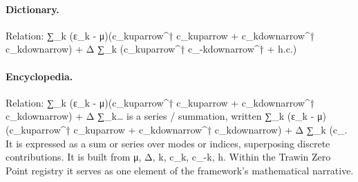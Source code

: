 \paragraph{Dictionary.}
Relation: ∑\_k (ε\_k - μ)(c\_kuparrow\textasciicircum{}† c\_kuparrow + c\_kdownarrow\textasciicircum{}† c\_kdownarrow) + Δ ∑\_k (c\_kuparrow\textasciicircum{}† c\_-kdownarrow\textasciicircum{}† + h.c.)

\paragraph{Encyclopedia.}
Relation: ∑\_k (ε\_k - μ)(c\_kuparrow\textasciicircum{}† c\_kuparrow + c\_kdownarrow\textasciicircum{}† c\_kdownarrow) + Δ ∑\_k… is a series / summation, written ∑\_k (ε\_k - μ)(c\_kuparrow\textasciicircum{}† c\_kuparrow + c\_kdownarrow\textasciicircum{}† c\_kdownarrow) + Δ ∑\_k (c\_. It is expressed as a sum or series over modes or indices, superposing discrete contributions. It is built from μ, Δ, k, c\_k, c\_-k, h. Within the Trawin Zero Point registry it serves as one element of the framework's mathematical narrative.
